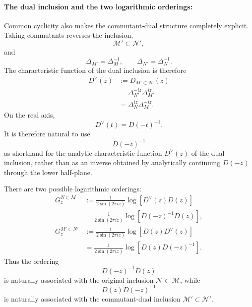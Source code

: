 \documentclass[a4paper,11pt]{article}
\theoremstyle{definition}
\begin{document}
\paragraph{The dual inclusion and the two logarithmic orderings:} Common cyclicity also makes the commutant-dual structure completely explicit.
Taking commutants reverses the inclusion,
\begin{equation}
    \mathcal M'\subset\mathcal N',
\end{equation}
and
\begin{equation}
    \Delta_{M'}=\Delta_M^{-1},
    \qquad
    \Delta_{N'}=\Delta_N^{-1}.
\end{equation}
The characteristic function of the dual inclusion is therefore
\begin{align}
    D^\vee(z)
    &:=
    D_{M'\subset N'}(z)
    \nonumber\\
    &=
    \Delta_{N'}^{-iz}
    \Delta_{M'}^{iz}
    \nonumber\\
    &=
    \Delta_N^{iz}
    \Delta_M^{-iz}.
    \label{eq:D-dual-common}
\end{align}
On the real axis,
\begin{equation}
    D^\vee(t)=D(-t)^{-1}.
    \label{eq:D-dual-real}
\end{equation}
It is therefore natural to use
\begin{equation}
    D(-z)^{-1}
\end{equation}
as shorthand for the analytic characteristic function $D^\vee(z)$ of the
dual inclusion, rather than as an inverse obtained by analytically
continuing $D(-z)$ through the lower half-plane.

There are two possible logarithmic orderings:
\begin{align}
    G_z^{N\subset M}
    &:=
    \frac{1}{2\sin(2\pi iz)}
    \log\left[
        D^\vee(z)D(z)
    \right]
    \nonumber\\
    &=
    \frac{1}{2\sin(2\pi iz)}
    \log\left[
        D(-z)^{-1}D(z)
    \right],
    \label{eq:G-original-common}
    \\
    G_z^{M'\subset N'}
    &:=
    \frac{1}{2\sin(2\pi iz)}
    \log\left[
        D(z)D^\vee(z)
    \right]
    \nonumber\\
    &=
    \frac{1}{2\sin(2\pi iz)}
    \log\left[
        D(z)D(-z)^{-1}
    \right].
    \label{eq:G-dual-common}
\end{align}
Thus the ordering
\begin{equation}
    D(-z)^{-1}D(z)
\end{equation}
is naturally associated with the original inclusion
$\mathcal N\subset\mathcal M$, while
\begin{equation}
    D(z)D(-z)^{-1}
\end{equation}
is naturally associated with the commutant-dual inclusion
$\mathcal M'\subset\mathcal N'$.
\end{document}
